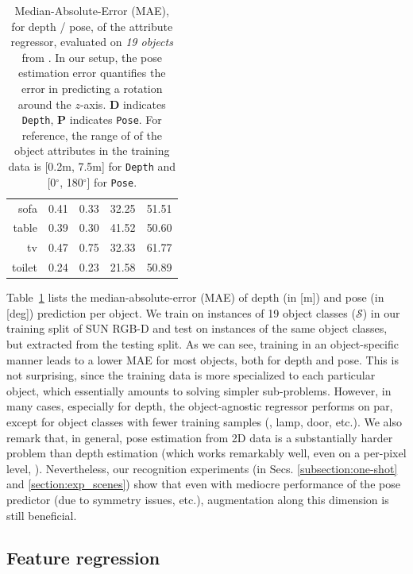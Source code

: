 \documentclass[10pt,twocolumn,letterpaper]{article}
\newcommand{\mnl}[1]{{\color{magenta}{($\leftarrow$ #1)}}}
\begin{document}
\begin{table}[t!]
{\begin{tabular}{rcccc}
                sofa & 0.41 & 0.33& 32.25 & 51.51  \\ 
               table & 0.39 & 0.30 & 41.52 & 50.60\\ 
                  tv & 0.47 & 0.75& 32.33 & 61.77  \\ 
              toilet & 0.24 & 0.23 & 21.58 & 50.89\\ 
		\hline
              \end{tabular}}
\caption{\label{table:maeCOR} Median-Absolute-Error (MAE), for depth / pose, 
of the attribute regressor, evaluated on \emph{19 objects} from \cite{Song15a}.
In our setup, the pose estimation error quantifies the error in predicting a
rotation around the $z$-axis. \textbf{D} indicates \texttt{Depth}, \textbf{P} indicates
\texttt{Pose}. For reference, the range of of the object attributes in the training data
is [0.2m, 7.5m] for \texttt{Depth} and [0$^\circ$, 180$^\circ$] for \texttt{Pose}.}
\end{table}

Table~\ref{table:maeCOR} lists the median-absolute-error (MAE) of
depth (in [m]) and pose (in [deg]) prediction per object. We train
on instances of 19 object classes ($\mathcal{S}$) in our training 
split of SUN RGB-D and test on instances of the same object classes,
but extracted from the testing split.
As we can see, training in an object-specific manner leads to 
a lower MAE for most objects, both for depth and pose. 
This is not surprising, since the training data is more specialized 
to each particular object, which essentially amounts to solving 
simpler sub-problems. However, in many cases, 
especially for depth, the object-agnostic regressor performs on par, 
except for object classes with fewer training samples (\ie, lamp, door, etc.). 
We also remark that, in general, pose estimation from 2D data is
a substantially harder problem than depth estimation (which works
remarkably well, even on a per-pixel level, \cf \cite{Liu15a}). 
Nevertheless, our recognition experiments (in Secs. \ref{subsection:one-shot} and \ref{section:exp_scenes}) show that 
even with mediocre performance of the pose predictor (due to 
symmetry issues, etc.), augmentation along this dimension is still 
beneficial.

\subsection{Feature regression}
\label{subsection:EvalFeatureRegression}
\end{document}
